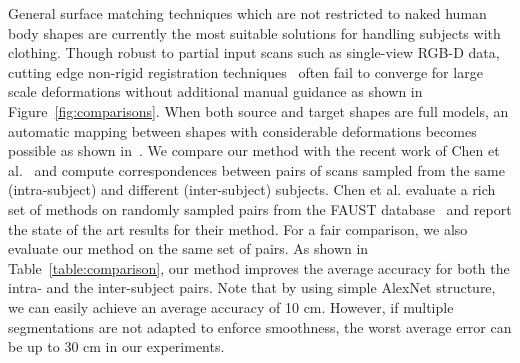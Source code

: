 \documentclass[10pt,twocolumn,letterpaper]{article}
\begin{document}
General surface matching techniques which are not restricted to naked human body shapes are currently the most suitable solutions for handling subjects with clothing. Though robust to partial input scans such as single-view RGB-D data, cutting edge non-rigid registration techniques~\cite{Huang:2008:NRU,li09robust} often fail to converge for large scale deformations without additional manual guidance as shown in Figure~\ref{fig:comparisons}. When both source and target shapes are full models, an automatic mapping between shapes with considerable deformations becomes possible as shown in~\cite{Kim11,Lipman:2009:MVS,Rodola_2014_CVPR,chen15}. We compare our method with the recent work of Chen et al.~\cite{chen15} and compute correspondences between pairs of scans sampled from the same (intra-subject) and different (inter-subject) subjects. Chen et al. evaluate a rich set of methods on randomly sampled pairs from the FAUST database~\cite{Bogo:CVPR:2014} and report the state of the art results for their method. For a fair comparison, we also evaluate our method on the same set of pairs. %
As shown in Table~\ref{table:comparison}, our method improves the average accuracy for both the intra- and the inter-subject pairs. Note that by using simple AlexNet structure, we can easily achieve an average accuracy of 10 cm. However, if multiple segmentations are not adapted to enforce smoothness, the worst average error can be up to 30 cm in our experiments.
\end{document}
